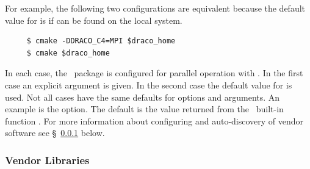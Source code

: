 For example, the following two configurations are equivalent because the default value for  is  if  can be found on the local system.
\begin{verbatim}
     $ cmake -DDRACO_C4=MPI $draco_home
     $ cmake $draco_home 
\end{verbatim}
In each case, the \cfour\ package is configured for parallel operation with .  In the first
case an explicit argument is given.  In the second case  the default value for
 is used.  Not all cases have the same defaults for
options and arguments.  An example is the 
option.  The default is the value returned from the \cmake\ built-in function .  For more information about configuring and auto-discovery of vendor software see \S~\ref{sec:vendor_libs} below.


\subsubsection{Vendor Libraries}
\label{sec:vendor_libs}


